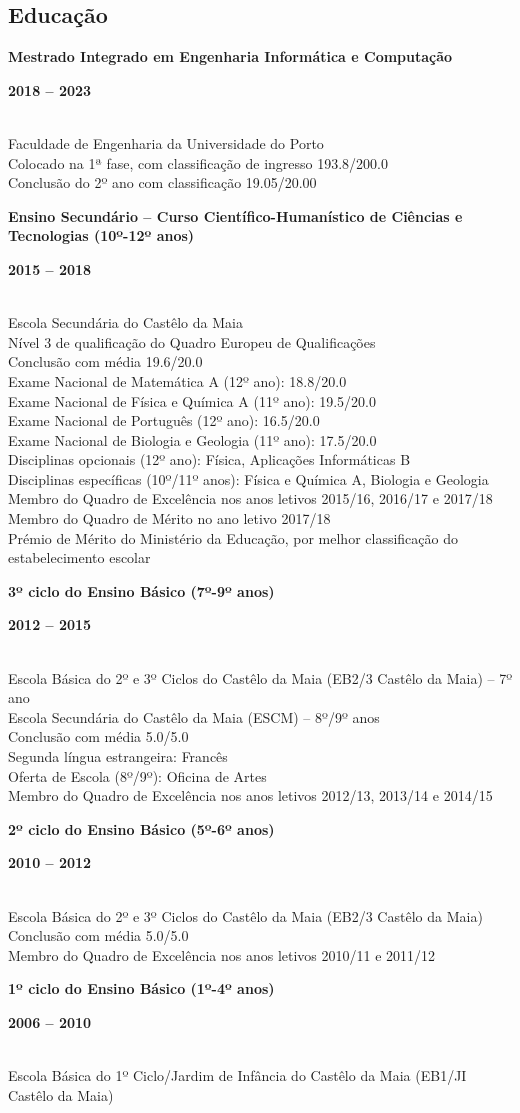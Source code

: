 \documentclass[8pt]{extarticle}
\newcommand{\parag}[1]{
\begin{minipage}{\textwidth} \hfill
\begin{minipage}{\dimexpr\textwidth-0.6cm}
	#1
\end{minipage}
\end{minipage}
}
\newcommand{\itemtime}[2]{
#1 \hfill \begin{minipage}[t]{0.185\textwidth}         #2  \end{minipage}
}
\newcommand{\job}[3]{\parag{
\itemtime{\textbf{#1}}{\textbf{#2}}\\
#3 \vspace*{9px}}}
\begin{document}
\subsection*{Educação}
\job{Mestrado Integrado em Engenharia Informática e Computação}{2018 – 2023}{
Faculdade de Engenharia da Universidade do Porto\\
Colocado na 1ª fase, com classificação de ingresso 193.8/200.0\\
Conclusão do 2º ano com classificação 19.05/20.00
}
\job{Ensino Secundário – Curso Científico-Humanístico de Ciências e Tecnologias (10º-12º anos)}{2015 – 2018}{
Escola Secundária do Castêlo da Maia\\
Nível 3 de qualificação do Quadro Europeu de Qualificações\\
Conclusão com média 19.6/20.0\\
Exame Nacional de Matemática A (12º ano): 18.8/20.0\\
Exame Nacional de Física e Química A (11º ano): 19.5/20.0\\
Exame Nacional de Português (12º ano): 16.5/20.0\\
Exame Nacional de Biologia e Geologia (11º ano): 17.5/20.0\\
Disciplinas opcionais (12º ano): Física, Aplicações Informáticas B\\
Disciplinas específicas (10º/11º anos): Física e Química A, Biologia e Geologia\\
Membro do Quadro de Excelência nos anos letivos 2015/16, 2016/17 e 2017/18\\
Membro do Quadro de Mérito no ano letivo 2017/18\\
Prémio de Mérito do Ministério da Educação, por melhor classificação do estabelecimento escolar
}
\job{3º ciclo do Ensino Básico (7º-9º anos)}{2012 – 2015}{
Escola Básica do 2º e 3º Ciclos do Castêlo da Maia (EB2/3 Castêlo da Maia) – 7º ano\\
Escola Secundária do Castêlo da Maia (ESCM) – 8º/9º anos\\
Conclusão com média 5.0/5.0\\
Segunda língua estrangeira: Francês\\
Oferta de Escola (8º/9º): Oficina de Artes\\
Membro do Quadro de Excelência nos anos letivos 2012/13, 2013/14 e 2014/15
}
\job{2º ciclo do Ensino Básico (5º-6º anos)}{2010 – 2012}{
Escola Básica do 2º e 3º Ciclos do Castêlo da Maia (EB2/3 Castêlo da Maia)\\
Conclusão com média 5.0/5.0\\
Membro do Quadro de Excelência nos anos letivos 2010/11 e 2011/12
}
\job{1º ciclo do Ensino Básico (1º-4º anos)}{2006 – 2010}{
Escola Básica do 1º Ciclo/Jardim de Infância do Castêlo da Maia (EB1/JI Castêlo da Maia)
}
\end{document}

